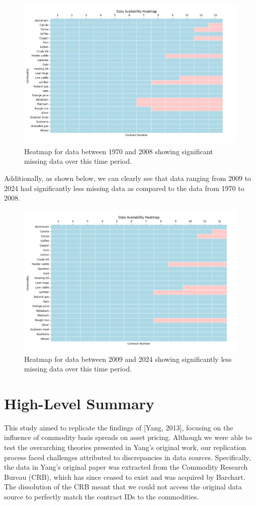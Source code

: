 \documentclass{article}
\begin{document}
\begin{figure}[h]
  \centering
  \includegraphics[width=0.5\linewidth]{../assets/1970_heat.jpg}
  \caption{Heatmap for data between 1970 and 2008 showing significant missing data over this time period.}
  \label{fig:my_graph}
\end{figure}

Additionally, as shown below, we can clearly see that data ranging from 2009 to 2024 had significantly less missing data as compared to the data from 1970 to 2008.

\begin{figure}[h]
  \centering
  \includegraphics[width=0.5\linewidth]{../assets/2009_heat.png}
  \caption{Heatmap for data between 2009 and 2024 showing significantly less missing data over this time period.}
  \label{fig:my_graph}
\end{figure}

\section{High-Level Summary}

This study aimed to replicate the findings of [Yang, 2013], focusing on the influence of commodity basis spreads on asset pricing. Although we were able to test the overarching theories presented in Yang’s original work, our replication process faced challenges attributed to discrepancies in data sources. Specifically, the data in Yang's original paper was extracted from the Commodity Research Bureau (CRB), which has since ceased to exist and was acquired by Barchart. The dissolution of the CRB meant that we could not access the original data source to perfectly match the contract IDs to the commodities.
\end{document}
